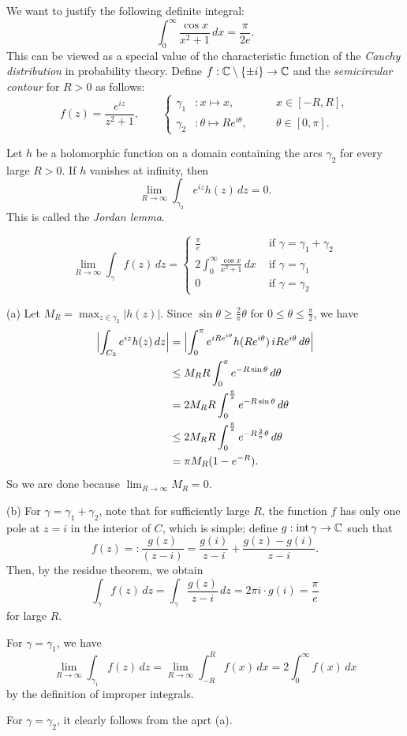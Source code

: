 \documentclass{../../large}
\begin{document}
\begin{prb}
We want to justify the following definite integral:
\[\int_0^\infty\frac{\cos x}{x^2+1}\,dx=\frac\pi{2e}.\]
This can be viewed as a special value of the characteristic function of the \emph{Cauchy distribution} in probability theory.
Define $f:\mathbb{C}\setminus\{\pm i\}\to\mathbb{C}$ and the \emph{semicircular contour} for $R>0$ as follows:
\[f(z)=\frac{e^{iz}}{z^2+1},\qquad
\left\{
\begin{alignedat}{2}
\gamma_1&:x\mapsto x,&\quad&x\in[-R,R],\\
\gamma_2&:\theta\mapsto Re^{i\theta},&&\theta\in[0,\pi].
\end{alignedat}
\right.\]
\begin{parts}
\item Let $h$ be a holomorphic function on a domain containing the arcs $\gamma_2$ for every large $R>0$.
If $h$ vanishes at infinity, then
\[\lim_{R\to\infty}\int_{\gamma_2}e^{iz}h(z)\,dz=0.\]
This is called the \emph{Jordan lemma}.
\item
\[\lim_{R\to\infty}\int_\gamma f(z)\,dz=\begin{cases}
\frac\pi e&\text{ if }\gamma=\gamma_1+\gamma_2\\
2\int_0^\infty\frac{\cos x}{x^2+1}\,dx&\text{ if }\gamma=\gamma_1\\
0&\text{ if }\gamma=\gamma_2
\end{cases}\]
\end{parts}
\end{prb}
\begin{pf}
(a)
Let $M_R=\max_{z\in \gamma_2}|h(z)|$.
Since $\sin\theta\ge\frac2\pi\theta$ for $0\le\theta\le\frac\pi2$, we have
\begin{align*}
\Bigl|\int_{C_2}e^{iz}h(z)\,dz\Bigr|
&=\Bigl|\int_0^\pi e^{iRe^{i\theta}}h(Re^{i\theta})\,iRe^{i\theta}\,d\theta\Bigr|\\
&\le M_RR\int_0^\pi e^{-R\sin\theta}\,d\theta\\
&=2M_RR\int_0^{\frac\pi2}e^{-R\sin\theta}\,d\theta\\
&\le2M_RR\int_0^{\frac\pi2}e^{-R\frac2\pi\theta}\,d\theta\\\
&=\pi M_R(1-e^{-R}).
\end{align*}
So we are done because $\lim_{R\to\infty}M_R=0$.

(b)
For $\gamma=\gamma_1+\gamma_2$, note that for sufficiently large $R$, the function $f$ has only one pole at $z=i$ in the interior of $C$, which is simple; define $g:\operatorname{int}\gamma\to\mathbb{C}$ such that
\[f(z)=:\frac{g(z)}{(z-i)}=\frac{g(i)}{z-i}+\frac{g(z)-g(i)}{z-i}.\]
Then, by the residue theorem, we obtain
\[\int_\gamma f(z)\,dz=\int_\gamma\frac{g(z)}{z-i}\,dz=2\pi i\cdot g(i)=\frac\pi e\]
for large $R$.

For $\gamma=\gamma_1$, we have
\[\lim_{R\to\infty}\int_{\gamma_1}f(z)\,dz=\lim_{R\to\infty}\int_{-R}^Rf(x)\,dx=2\int_0^\infty f(x)\,dx\]
by the definition of improper integrals.

For $\gamma=\gamma_2$, it clearly follows from the aprt (a).
\end{pf}
\end{document}
